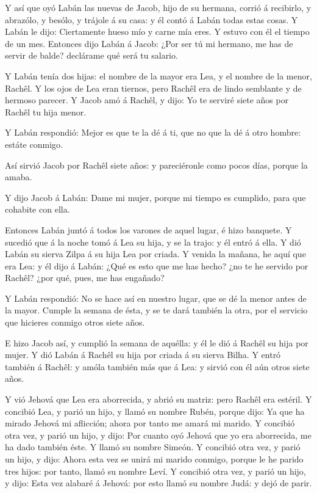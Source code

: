  Y así que oyó Labán las nuevas de Jacob, hijo de su
hermana, corrió á recibirlo, y abrazólo, y besólo, y trájole á su casa:
y él contó á Labán todas estas cosas.  Y Labán le dijo:
Ciertamente hueso mío y carne mía eres. Y estuvo con él el tiempo de un
mes.  Entonces dijo Labán á Jacob: ¿Por ser tú mi hermano,
me has de servir de balde? declárame qué será tu salario.

 Y Labán tenía dos hijas: el nombre de la mayor era Lea, y
el nombre de la menor, Rachêl.  Y los ojos de Lea eran
tiernos, pero Rachêl era de lindo semblante y de hermoso parecer.
 Y Jacob amó á Rachêl, y dijo: Yo te serviré siete años por
Rachêl tu hija menor.

 Y Labán respondió: Mejor es que te la dé á ti, que no que
la dé á otro hombre: estáte conmigo.

 Así sirvió Jacob por Rachêl siete años: y pareciéronle
como pocos días, porque la amaba.

 Y dijo Jacob á Labán: Dame mi mujer, porque mi tiempo es
cumplido, para que cohabite con ella.

 Entonces Labán juntó á todos los varones de aquel lugar, é
hizo banquete.  Y sucedió que á la noche tomó á Lea su
hija, y se la trajo: y él entró á ella.  Y dió Labán su
sierva Zilpa á su hija Lea por criada.  Y venida la mañana,
he aquí que era Lea: y él dijo á Labán: ¿Qué es esto que me has hecho?
¿no te he servido por Rachêl? ¿por qué, pues, me has engañado?

 Y Labán respondió: No se hace así en nuestro lugar, que se
dé la menor antes de la mayor.  Cumple la semana de ésta, y
se te dará también la otra, por el servicio que hicieres conmigo otros
siete años.

 E hizo Jacob así, y cumplió la semana de aquélla: y él le
dió á Rachêl su hija por mujer.  Y dió Labán á Rachêl su
hija por criada á su sierva Bilha.  Y entró también á
Rachêl: y amóla también más que á Lea: y sirvió con él aún otros siete
años.

 Y vió Jehová que Lea era aborrecida, y abrió su matriz:
pero Rachêl era estéril.  Y concibió Lea, y parió un hijo,
y llamó su nombre Rubén, porque dijo: Ya que ha mirado Jehová mi
aflicción; ahora por tanto me amará mi marido.  Y concibió
otra vez, y parió un hijo, y dijo: Por cuanto oyó Jehová que yo era
aborrecida, me ha dado también éste. Y llamó su nombre Simeón.
 Y concibió otra vez, y parió un hijo, y dijo: Ahora esta
vez se unirá mi marido conmigo, porque le he parido tres hijos: por
tanto, llamó su nombre Leví.  Y concibió otra vez, y parió
un hijo, y dijo: Esta vez alabaré á Jehová: por esto llamó su nombre
Judá: y dejó de parir.

